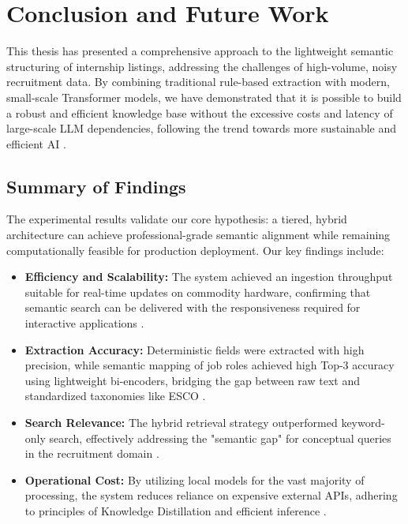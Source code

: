 \chapter{Conclusion and Future Work}
This thesis has presented a comprehensive approach to the lightweight semantic structuring of internship listings, addressing the challenges of high-volume, noisy recruitment data. By combining traditional rule-based extraction with modern, small-scale Transformer models, we have demonstrated that it is possible to build a robust and efficient knowledge base without the excessive costs and latency of large-scale LLM dependencies, following the trend towards more sustainable and efficient AI \cite{schwartz2020green, menghani2023efficient}.

\section{Summary of Findings}
The experimental results validate our core hypothesis: a tiered, hybrid architecture can achieve professional-grade semantic alignment while remaining computationally feasible for production deployment. Our key findings include:

\begin{itemize}
    \item \textbf{Efficiency and Scalability:} The system achieved an ingestion throughput suitable for real-time updates on commodity hardware, confirming that semantic search can be delivered with the responsiveness required for interactive applications \cite{buttcher2016information, johnson2019billion}.
    \item \textbf{Extraction Accuracy:} Deterministic fields were extracted with high precision, while semantic mapping of job roles achieved high Top-3 accuracy using lightweight bi-encoders, bridging the gap between raw text and standardized taxonomies like ESCO \cite{esco2017handbook, reimers2019sentence}.
    \item \textbf{Search Relevance:} The hybrid retrieval strategy outperformed keyword-only search, effectively addressing the "semantic gap" for conceptual queries in the recruitment domain \cite{thakur2021beir, luan2021sparse}.
    \item \textbf{Operational Cost:} By utilizing local models for the vast majority of processing, the system reduces reliance on expensive external APIs, adhering to principles of Knowledge Distillation and efficient inference \cite{hsieh2023distilling, menghani2023efficient}.
\end{itemize}

